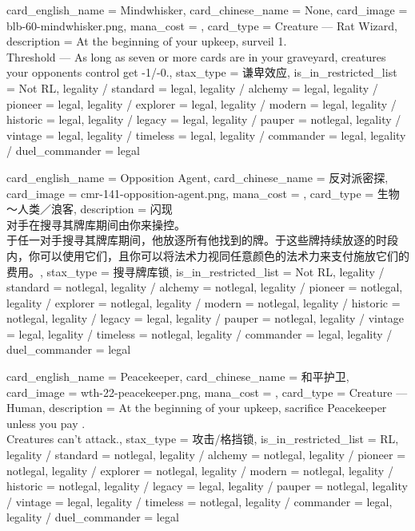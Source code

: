 \documentclass[lang = cn, color = black, 10pt]{AllThatStax}
\begin{document}
\card
{
	card_english_name = {Mindwhisker},
	card_chinese_name = {None},
	card_image = blb-60-mindwhisker.png,
	mana_cost = ,
	card_type = Creature — Rat Wizard,
	description = {At the beginning of your upkeep, surveil 1. \\
		Threshold — As long as seven or more cards are in your graveyard, creatures your opponents control get -1/-0.},
	stax_type = 谦卑效应,
	is_in_restricted_list = Not RL,
	legality / standard = legal,
	legality / alchemy = legal,
	legality / pioneer = legal,
	legality / explorer = legal,
	legality / modern = legal,
	legality / historic = legal,
	legality / legacy = legal,
	legality / pauper = notlegal,
	legality / vintage = legal,
	legality / timeless = legal,
	legality / commander = legal,
	legality / duel_commander = legal
}

\card
{
	card_english_name = {Opposition Agent},
	card_chinese_name = {反对派密探},
	card_image = cmr-141-opposition-agent.png,
	mana_cost = ,
	card_type = 生物 ～人类／浪客,
	description = {闪现\\
		对手在搜寻其牌库期间由你来操控。\\
		于任一对手搜寻其牌库期间，他放逐所有他找到的牌。于这些牌持续放逐的时段内，你可以使用它们，且你可以将法术力视同任意颜色的法术力来支付施放它们的费用。},
	stax_type = 搜寻牌库锁,
	is_in_restricted_list = Not RL,
	legality / standard = notlegal,
	legality / alchemy = notlegal,
	legality / pioneer = notlegal,
	legality / explorer = notlegal,
	legality / modern = notlegal,
	legality / historic = notlegal,
	legality / legacy = legal,
	legality / pauper = notlegal,
	legality / vintage = legal,
	legality / timeless = notlegal,
	legality / commander = legal,
	legality / duel_commander = legal
}

\card
{
	card_english_name = {Peacekeeper},
	card_chinese_name = {和平护卫},
	card_image = wth-22-peacekeeper.png,
	mana_cost = ,
	card_type = Creature — Human,
	description = {At the beginning of your upkeep, sacrifice Peacekeeper unless you pay .\\
		Creatures can't attack.},
	stax_type = 攻击/格挡锁,
	is_in_restricted_list = RL,
	legality / standard = notlegal,
	legality / alchemy = notlegal,
	legality / pioneer = notlegal,
	legality / explorer = notlegal,
	legality / modern = notlegal,
	legality / historic = notlegal,
	legality / legacy = legal,
	legality / pauper = notlegal,
	legality / vintage = legal,
	legality / timeless = notlegal,
	legality / commander = legal,
	legality / duel_commander = legal
}
\end{document}
